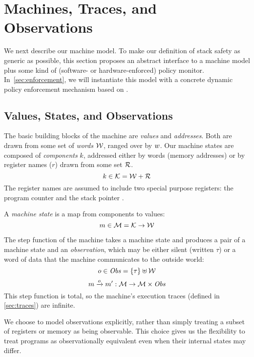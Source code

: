 \documentclass[acmsmall,review,anonymous]{acmart}\settopmatter{printfolios=true,printccs=false,printacmref=false}
\begin{document}


\section{Machines, Traces, and Observations}
\label{sec:prelim}

We next describe our machine model. To make our definition of stack safety
as generic as possible, this section proposes an abstract interface to a
machine model plus some kind of 
(software- or
hardware-enforced) policy monitor. In~\cref{sec:enforcement}, we will
instantiate this model with a concrete dynamic policy enforcement mechanism
based on \citet{DBLP:conf/sp/RoesslerD18}.

\subsection{Values, States, and Observations}

The basic building blocks of the machine are {\em values} and {\em
  addresses}. Both are drawn from some set of {\em words}
${\mathcal W}$, ranged over by $w$.
%
Our machine states are composed of {\em components} $k$, addressed either by
words (memory addresses) or by register names ($r$) drawn from some set
${\mathcal R}$.
%
    \[k \in {\mathcal K} = {\mathcal W} + {\mathcal R} \]
%
The register names are assumed to include two special purpose registers: the
program counter {\PCname} and the stack pointer \SP.

A {\em machine state} is a map from components to values:
%
\[m \in {\mathcal M} = {\mathcal K} \rightarrow {\mathcal W}\]

The step function of the machine takes a machine state and produces a
pair of a machine state and an {\em observation}, which may be either
silent (written $\tau$) or a word of data that the machine
communicates to the outside world:
%
\[o \in \mathit{Obs} = \{\tau\} \uplus {\mathcal W}\]
\[m \xrightarrow{o} m' : {\mathcal M} \rightarrow {\mathcal M} \times \mathit{Obs} \]
%
This step function is total, so the machine's execution traces
(defined in \cref{sec:traces}) are infinite.

We choose to model observations explicitly, rather than simply
treating
a subset of registers or memory as being observable.  This choice gives
us the flexibility to treat programs as observationally equivalent even when
their internal states may differ.
\end{document}
